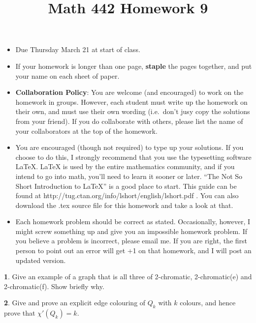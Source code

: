 \documentclass[12pt]{article}
\title{\vspace{-2.0cm}Math 442 Homework 9}
\date{}
\theoremstyle{definition}
\newtheorem{problem}{}
\begin{document}
%
%
\maketitle
%
\vspace{-16 mm}
\begin{itemize}
\item Due Thursday March 21 at start of class.
%
\item If your homework is longer than one page, {\bf staple} the pages together, and put your name on each sheet of paper.
%
\item {\bf Collaboration Policy}: You are welcome (and encouraged) to work on the homework in groups. However, each student must write up the homework on their own, and must use their own wording (i.e.~don't jusy copy the solutions from your friend). If you do collaborate with others, please list the name of your collaborators at the top of the homework.

\item You are encouraged (though not required) to type up your solutions. If you choose to do this, I strongly recommend that you use the typesetting software LaTeX. LaTeX is used by the entire mathematics community, and if you intend to go into math, you’ll need to learn it sooner or later. ``The Not So Short Introduction to LaTeX'' is a good place to start. This guide can be found at http://tug.ctan.org/info/lshort/english/lshort.pdf . You can also download the .tex source file for this homework and take a look at that.

\item Each homework problem should be correct as stated. Occasionally, however, I might screw something up and give you an impossible homework problem. If you believe a problem is incorrect, please email me. If you are right, the first person to point out an error will get +1 on that homework, and I will post an updated version. 
\end{itemize}

\begin{problem}
Give an example of a graph that is all three of 2-chromatic, 2-chromatic(e) and 2-chromatic(f). Show briefly why.
\end{problem}

\begin{problem}
Give and prove an explicit edge colouring of $Q_k$ with $k$ colours, and hence prove that $\chi '(Q_k) = k$.
\end{problem}
\end{document}
